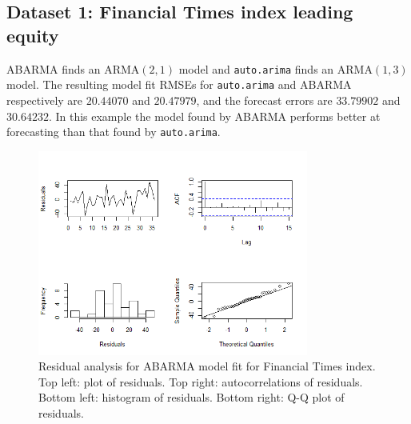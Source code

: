 \iffalse
\subsection{Dataset 1: Financial Times index leading equity}

ABARMA finds an ARMA$(2,1)$ model and {\tt auto.arima} finds an ARMA$(1,3)$ model.  The resulting model fit RMSEs for  {\tt auto.arima} and ABARMA respectively are  $20.44070$ and  $20.47979$, and the forecast errors are $33.79902$ and  $30.64232$.  In this example the model found by ABARMA performs better at forecasting than that found by {\tt auto.arima}.

\begin{figure}[h]
    \centering
    \includegraphics[width=3.5in]{diagnostics_fin.png}
    \caption{Residual analysis for ABARMA model fit for Financial Times index. Top left: plot of residuals. Top right: autocorrelations of residuals. Bottom left: histogram of residuals. Bottom right: Q-Q plot of residuals.}
    \label{fig: fin}
\end{figure}

